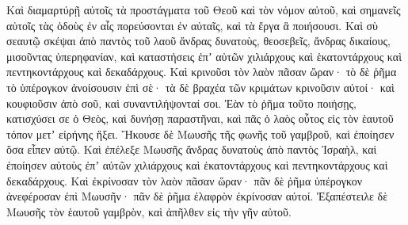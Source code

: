 {Καὶ διαμαρτύρῇ αὐτοῖς τὰ προστάγματα τοῦ Θεοῦ καὶ τὸν νόμον αὐτοῦ, καὶ σημανεῖς αὐτοῖς τὰς ὁδοὺς ἐν αἷς πορεύσονται ἐν αὐταῖς, καὶ τὰ ἔργα ἃ ποιήσουσι.
Καὶ σὺ σεαυτῷ σκέψαι ἀπὸ παντὸς τοῦ λαοῦ ἄνδρας δυνατοὺς, θεοσεβεῖς, ἄνδρας δικαίους, μισοῦντας ὑπερηφανίαν, καὶ καταστήσεις ἐπʼ αὐτῶν χιλιάρχους καὶ ἑκατοντάρχους καὶ πεντηκοντάρχους καὶ δεκαδάρχους.
Καὶ κρινοῦσι τὸν λαὸν πᾶσαν ὥραν· τὸ δὲ ῥῆμα τὸ ὑπέρογκον ἀνοίσουσιν ἐπὶ σὲ· τὰ δὲ βραχέα τῶν κριμάτων κρινοῦσιν αὐτοί· καὶ κουφιοῦσιν ἀπὸ σοῦ, καὶ συναντιλήψονταί σοι.
Ἐὰν τὸ ῥῆμα τοῦτο ποιήσῃς, κατισχύσει σε ὁ Θεὸς, καὶ δυνήσῃ παραστῆναι, καὶ πᾶς ὁ λαὸς οὗτος εἰς τὸν ἑαυτοῦ τόπον μετʼ εἰρήνης ἥξει.
Ἤκουσε δὲ Μωυσῆς τῆς φωνῆς τοῦ γαμβροῦ, καὶ ἐποίησεν ὅσα εἶπεν αὐτῷ.
Καὶ ἐπέλεξε Μωυσῆς ἄνδρας δυνατοὺς ἀπὸ παντὸς Ἰσραὴλ, καὶ ἐποίησεν αὐτοὺς ἐπʼ αὐτῶν χιλιάρχους καὶ ἑκατοντάρχους καὶ πεντηκοντάρχους καὶ δεκαδάρχους.
Καὶ ἐκρίνοσαν τὸν λαὸν πᾶσαν ὥραν· πᾶν δὲ ῥῆμα ὑπέρογκον ἀνεφέροσαν ἐπὶ Μωυσῆν· πᾶν δὲ ῥῆμα ἐλαφρὸν ἐκρίνοσαν αὐτοί.
Ἐξαπέστειλε δὲ Μωυσῆς τὸν ἑαυτοῦ γαμβρὸν, καὶ ἀπῆλθεν εἰς τὴν γῆν αὐτοῦ.

}
